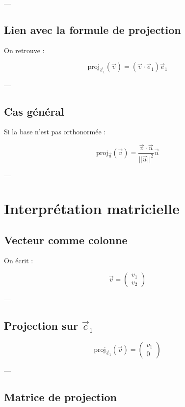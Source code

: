 \documentclass[11pt,a4paper]{article}
\begin{document}
---

\subsection{Lien avec la formule de projection}

On retrouve :

\[
\text{proj}_{\vec{e}_1}(\vec{v}) = (\vec{v} \cdot \vec{e}_1)\vec{e}_1
\]

---

\subsection{Cas général}

Si la base n’est pas orthonormée :

\[
\text{proj}_{\vec{u}}(\vec{v}) =
\frac{\vec{v} \cdot \vec{u}}{||\vec{u}||^2} \vec{u}
\]

---

\section{Interprétation matricielle}

\subsection{Vecteur comme colonne}

On écrit :

\[
\vec{v} =
\begin{pmatrix}
v_1 \\
v_2
\end{pmatrix}
\]

---

\subsection{Projection sur $\vec{e}_1$}

\[
\text{proj}_{\vec{e}_1}(\vec{v}) =
\begin{pmatrix}
v_1 \\
0
\end{pmatrix}
\]

---

\subsection{Matrice de projection}
\end{document}

